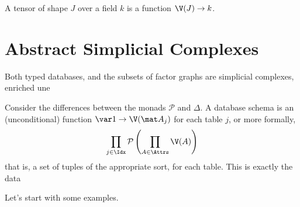 \documentclass{article}
\newcommand{\Pow}{\mathcal P}
\begin{document}
    \begin{inactive}
        A tensor of shape $J$ over a field $k$ is a function $\V(J) \to k$. 
    \end{inactive}
    
    \section{Abstract Simplicial Complexes}
    
    Both typed databases, and the subsets of factor graphs are simplicial complexes, enriched une
    
    
    Consider the differences between the monads $\Pow$ and $\Delta$. 
    A database schema is an (unconditional) function $\var 1 \to \V(\mat A_j)$ for each table $j$, or more formally,
    \[ \prod_{j \in \Idx} \Pow\left( \prod_{A \in \Attrs} \V(A) \right) \]
    that is, a set of tuples of the appropriate sort, for each table. This is exactly the data
    
    
    Let's start with some examples.
    
\end{document}
